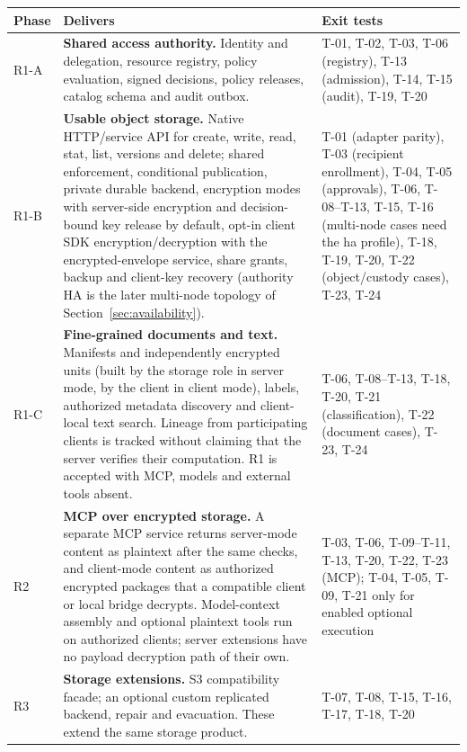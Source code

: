 \begin{longtable}{@{}P{0.08\textwidth}P{0.50\textwidth}P{0.30\textwidth}@{}}
\toprule Phase & Delivers & Exit tests\\\midrule\endhead
R1-A & \textbf{Shared access authority.} Identity and delegation, resource registry, policy evaluation, signed decisions, policy releases, catalog schema and audit outbox. & T-01, T-02, T-03, T-06 (registry), T-13 (admission), T-14, T-15 (audit), T-19, T-20\\
R1-B & \textbf{Usable object storage.} Native HTTP/service API for create, write, read, stat, list, versions and delete; shared enforcement, conditional publication, private durable backend, encryption modes with server-side encryption and decision-bound key release by default, opt-in client SDK encryption/decryption with the encrypted-envelope service, share grants, backup and client-key recovery (authority HA is the later multi-node topology of Section~\ref{sec:availability}). & T-01 (adapter parity), T-03 (recipient enrollment), T-04, T-05 (approvals), T-06, T-08--T-13, T-15, T-16 (multi-node cases need the ha profile), T-18, T-19, T-20, T-22 (object/custody cases), T-23, T-24\\
R1-C & \textbf{Fine-grained documents and text.} Manifests and independently encrypted units (built by the storage role in server mode, by the client in client mode), labels, authorized metadata discovery and client-local text search. Lineage from participating clients is tracked without claiming that the server verifies their computation. R1 is accepted with MCP, models and external tools absent. & T-06, T-08--T-13, T-18, T-20, T-21 (classification), T-22 (document cases), T-23, T-24\\
R2 & \textbf{MCP over encrypted storage.} A separate MCP service returns server-mode content as plaintext after the same checks, and client-mode content as authorized encrypted packages that a compatible client or local bridge decrypts. Model-context assembly and optional plaintext tools run on authorized clients; server extensions have no payload decryption path of their own. & T-03, T-06, T-09--T-11, T-13, T-20, T-22, T-23 (MCP); T-04, T-05, T-09, T-21 only for enabled optional execution\\
R3 & \textbf{Storage extensions.} S3 compatibility facade; an optional custom replicated backend, repair and evacuation. These extend the same storage product. & T-07, T-08, T-15, T-16, T-17, T-18, T-20\\
\bottomrule
\end{longtable}
